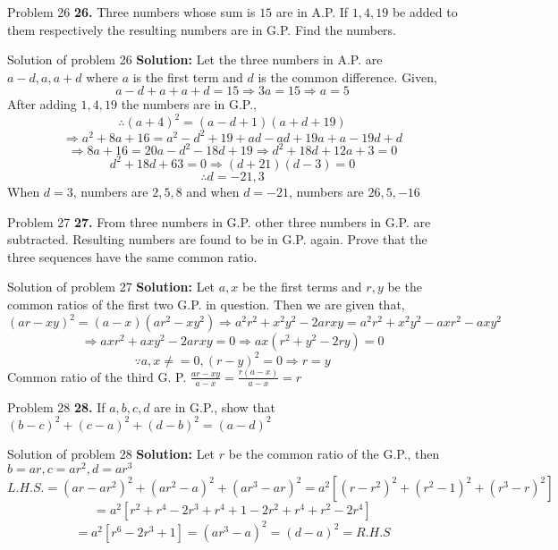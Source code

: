 \documentclass[aspectratio=1610,8pt]{beamer}
\begin{document}
\begin{frame}{Problem 26}
  \textbf{26.} Three numbers whose sum is $15$ are in A.P. If $1, 4, 19$ be
  added to them respectively the resulting numbers are in G.P. Find the
  numbers.
\end{frame}
\begin{frame}{Solution of problem 26}
  \textbf{Solution:} Let the three numbers in A.P. are $a - d, a, a + d$ where
  $a$ is the first term and $d$ is the common difference. Given,
  $$a - d + a + a + d = 15 \Rightarrow 3a = 15 \Rightarrow a = 5$$
  After adding $1, 4, 19$ the numbers are in G.P.,
  $$\therefore (a + 4)^2 = (a - d + 1)(a + d + 19)$$
  $$\Rightarrow a^2 + 8a + 16 = a^2 - d^2 + 19 + ad - ad + 19a + a - 19d + d$$
  $$\Rightarrow 8a + 16 = 20a - d^2 - 18d + 19 \Rightarrow d^2 + 18d + 12a + 3  = 0$$
  $$d^2 + 18d +63 = 0 \Rightarrow (d + 21)(d - 3) = 0$$
  $$\therefore d = -21, 3$$
  When $d = 3$, numbers are $2, 5, 8$ and when $d = -21$, numbers are $26, 5,
  -16$
\end{frame}
\begin{frame}{Problem 27}
  \textbf{27.} From three numbers in G.P. other three numbers in G.P. are
  subtracted. Resulting numbers are found to be in G.P. again. Prove that the
  three sequences have the same common ratio.
\end{frame}
\begin{frame}{Solution of problem 27}
  \textbf{Solution:} Let $a, x$ be the first terms and $r, y$ be the common
  ratios of the first two G.P. in question. Then we are given that,
  $$(ar - xy)^2 = (a - x)(ar^2 - xy^2) \Rightarrow a^2r^2 + x^2y^2 - 2arxy =
  a^2r^2 + x^2y^2 - axr^2 - axy^2$$
  $$\Rightarrow axr^2 + axy^2 - 2arxy = 0 \Rightarrow ax(r^2 + y^2 - 2ry) = 0$$
  $$\because a, x \neq = 0, (r - y)^2 = 0 \Rightarrow r = y$$
  Common ratio of the third G. P. $\frac{ar - xy}{a - x} = \frac{r(a - x)}{a -
    x} = r$
\end{frame}
\begin{frame}{Problem 28}
  \textbf{28.} If $a, b, c, d$ are in G.P., show that $(b - c)^2 + (c - a)^2 +  (d - b)^2 = (a - d)^2$
\end{frame}
\begin{frame}{Solution of problem 28}
  \textbf{Solution:} Let $r$ be the common ratio of the G.P., then $b = ar, c =
  ar^2, d= ar^3$
  $$L.H.S. = (ar - ar^2)^2 + (ar^2 - a)^2 + (ar^3 -ar)^2 = a^2[(r - r^2)^2 +
  (r^2 - 1)^2 + (r^3 -r)^2]$$
  $$= a^2[r^2 + r^4 - 2r^3 + r^4 + 1 - 2r^2 + r^4 + r^2 - 2r^4]$$
  $$= a^2[r^6 -2r^3 + 1] = (ar^3 - a)^2 = (d - a)^2 = R.H.S$$
\end{frame}
\end{document}

